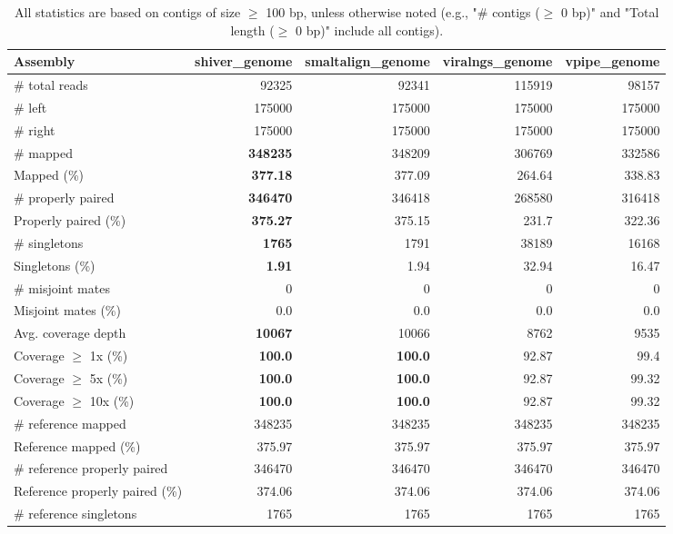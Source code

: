 \documentclass[12pt,a4paper]{article}
\begin{document}
\begin{table}[ht]
\begin{center}
\caption{All statistics are based on contigs of size $\geq$ 100 bp, unless otherwise noted (e.g., "\# contigs ($\geq$ 0 bp)" and "Total length ($\geq$ 0 bp)" include all contigs).}
\begin{tabular}{|l*{4}{|r}|}
\hline
Assembly & shiver\_genome & smaltalign\_genome & viralngs\_genome & vpipe\_genome \\ \hline
\# total reads & 92325 & 92341 & 115919 & 98157 \\ \hline
\# left & 175000 & 175000 & 175000 & 175000 \\ \hline
\# right & 175000 & 175000 & 175000 & 175000 \\ \hline
\# mapped & {\bf 348235} & 348209 & 306769 & 332586 \\ \hline
Mapped (\%) & {\bf 377.18} & 377.09 & 264.64 & 338.83 \\ \hline
\# properly paired & {\bf 346470} & 346418 & 268580 & 316418 \\ \hline
Properly paired (\%) & {\bf 375.27} & 375.15 & 231.7 & 322.36 \\ \hline
\# singletons & {\bf 1765} & 1791 & 38189 & 16168 \\ \hline
Singletons (\%) & {\bf 1.91} & 1.94 & 32.94 & 16.47 \\ \hline
\# misjoint mates & 0 & 0 & 0 & 0 \\ \hline
Misjoint mates (\%) & 0.0 & 0.0 & 0.0 & 0.0 \\ \hline
Avg. coverage depth & {\bf 10067} & 10066 & 8762 & 9535 \\ \hline
Coverage $\geq$ 1x (\%) & {\bf 100.0} & {\bf 100.0} & 92.87 & 99.4 \\ \hline
Coverage $\geq$ 5x (\%) & {\bf 100.0} & {\bf 100.0} & 92.87 & 99.32 \\ \hline
Coverage $\geq$ 10x (\%) & {\bf 100.0} & {\bf 100.0} & 92.87 & 99.32 \\ \hline
\# reference mapped & 348235 & 348235 & 348235 & 348235 \\ \hline
Reference mapped (\%) & 375.97 & 375.97 & 375.97 & 375.97 \\ \hline
\# reference properly paired & 346470 & 346470 & 346470 & 346470 \\ \hline
Reference properly paired (\%) & 374.06 & 374.06 & 374.06 & 374.06 \\ \hline
\# reference singletons & 1765 & 1765 & 1765 & 1765 \\ \hline

\end{tabular}
\end{center}
\end{table}
\end{document}

